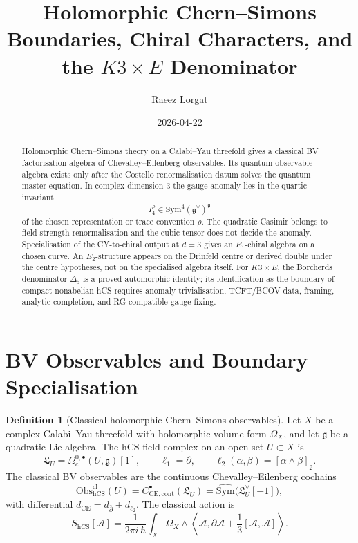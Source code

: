 \documentclass[11pt]{article}
\title{Holomorphic Chern--Simons Boundaries, Chiral Characters, and the
\texorpdfstring{$K3\times E$}{K3 x E} Denominator}
\author{Raeez Lorgat}
\date{2026-04-22}
\theoremstyle{definition}
\newtheorem{definition}[theorem]{Definition}
\theoremstyle{remark}
\newcommand{\fg}{\mathfrak{g}}
\newcommand{\hCS}{\mathrm{hCS}}
\newcommand{\Obs}{\mathrm{Obs}}
\newcommand{\CE}{\mathrm{CE}}
\newcommand{\Sym}{\mathrm{Sym}}
\newcommand{\Eone}{E_1}
\newcommand{\Etwo}{E_2}
\begin{document}
\maketitle

\begin{abstract}
Holomorphic Chern--Simons theory on a Calabi--Yau threefold gives a
classical BV factorisation algebra of Chevalley--Eilenberg observables.
Its quantum observable algebra exists only after the Costello
renormalisation datum solves the quantum master equation. In complex
dimension \(3\) the gauge anomaly lies in the quartic invariant
\[
  I_4^\rho\in \Sym^4(\fg^\vee)^\fg
\]
of the chosen representation or trace convention \(\rho\). The
quadratic Casimir belongs to field-strength renormalisation and the
cubic tensor does not decide the anomaly. Specialisation of the
CY-to-chiral output at \(d=3\) gives an \(\Eone\)-chiral algebra on a
chosen curve. An \(\Etwo\)-structure appears on the Drinfeld centre or
derived double under the centre hypotheses, not on the specialised
algebra itself. For \(K3\times E\), the Borcherds denominator
\(\Delta_5\) is a proved automorphic identity; its identification as the
boundary of compact nonabelian hCS requires anomaly trivialisation,
TCFT/BCOV data, framing, analytic completion, and RG-compatible
gauge-fixing.
\end{abstract}

\tableofcontents

\section{BV Observables and Boundary Specialisation}
\label{sec:bv-boundary}

\begin{definition}[Classical holomorphic Chern--Simons observables]
\label{def:classical-hcs-observables}
Let \(X\) be a complex Calabi--Yau threefold with holomorphic volume
form \(\Omega_X\), and let \(\fg\) be a quadratic Lie algebra. The hCS
field complex on an open set \(U\subset X\) is
\[
  \mathfrak L_U=\Omega^{0,\bullet}_c(U,\fg)[1],
  \qquad
  \ell_1=\bar\partial,\qquad
  \ell_2(\alpha,\beta)=[\alpha\wedge\beta]_\fg .
\]
The classical BV observables are the continuous Chevalley--Eilenberg
cochains
\[
  \Obs^{\mathrm{cl}}_{\hCS}(U)
  =
  C^\bullet_{\CE,\mathrm{cont}}(\mathfrak L_U)
  =
  \widehat{\Sym}\bigl(\mathfrak L_U^\vee[-1]\bigr),
\]
with differential \(d_{\CE}=d_{\bar\partial}+d_{\ell_2}\). The classical
action is
\[
  S_{\hCS}[\mathcal A]
  =
  \frac{1}{2\pi i\,\hbar}
  \int_X\Omega_X\wedge
  \left\langle\mathcal A,\bar\partial\mathcal A
  +\frac13[\mathcal A,\mathcal A]\right\rangle .
\]
\end{definition}
\end{document}
